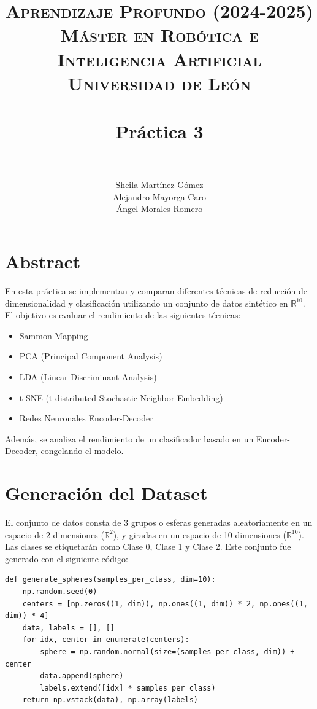 \documentclass[paper=a4, fontsize=11pt]{scrartcl} %
\title{	
\normalfont \normalsize 
\textsc{{\textbf{Aprendizaje Profundo (2024-2025)}} \\ Máster en Robótica e Inteligencia Artificial \\ Universidad de León} \\ [20pt] %
\horrule{0.5pt} \\[0.4cm] %
\huge Práctica 3 \\   %
\horrule{1.5pt} \\[0.2cm] %
}
\author{Sheila Martínez Gómez\\
Alejandro Mayorga Caro\\
Ángel Morales Romero\\
}
\numberwithin{equation}{section} %
\numberwithin{figure}{section} %
\numberwithin{table}{section} %
\begin{document}
\maketitle
\newpage %

\tableofcontents %
\pagebreak
\section{Abstract}

En esta práctica se implementan y comparan diferentes técnicas de reducción de dimensionalidad y clasificación utilizando un conjunto de datos sintético en \(\mathbb{R}^{10}\). El objetivo es evaluar el rendimiento de las siguientes técnicas:

\begin{itemize}
    \item Sammon Mapping
    \item PCA (Principal Component Analysis)
    \item LDA (Linear Discriminant Analysis)
    \item t-SNE (t-distributed Stochastic Neighbor Embedding)
    \item Redes Neuronales Encoder-Decoder
\end{itemize}

Además, se analiza el rendimiento de un clasificador basado en un Encoder-Decoder, congelando el modelo.

\section{Generación del Dataset}

El conjunto de datos consta de 3 grupos o esferas generadas aleatoriamente en un espacio de 2 dimensiones (\(\mathbb{R}^{2}\)), y giradas en un espacio de 10 dimensiones (\(\mathbb{R}^{10}\)). Las clases se etiquetarán como Clase 0, Clase 1 y Clase 2. Este conjunto fue generado con el siguiente código:

\begin{verbatim}
def generate_spheres(samples_per_class, dim=10):
    np.random.seed(0)
    centers = [np.zeros((1, dim)), np.ones((1, dim)) * 2, np.ones((1, dim)) * 4]
    data, labels = [], []
    for idx, center in enumerate(centers):
        sphere = np.random.normal(size=(samples_per_class, dim)) + center
        data.append(sphere)
        labels.extend([idx] * samples_per_class)
    return np.vstack(data), np.array(labels)
\end{verbatim}
\end{document}
